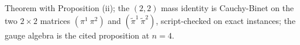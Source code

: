 Theorem  with Proposition (ii); the $(2,2)$ mass identity is Cauchy-Binet on the two $2 \times 2$ matrices $(\pi^{1}\ \pi^{2})$ and $(\tilde\pi^{1}\ \tilde\pi^{2})$, script-checked on exact instances; the gauge algebra is the cited proposition at $n = 4$.
